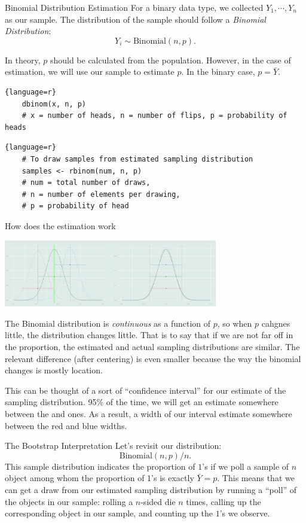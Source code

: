 \begin{thm}{Binomial Distribution Estimation}
	For a binary data type, we collected $Y_1,\cdots,Y_n$ as our sample. The distribution of the sample should follow a \textit{Binomial Distribution}: \[Y_i\sim\text{Binomial}(n,p).\]
\end{thm}
\begin{rmk}
	In theory, $p$ should be calculated from the population. However, in the case of estimation, we will use our sample to estimate $p$. In the binary case, $p=\bar{Y}$.
\end{rmk}
\begin{lstlisting}[title=Binomial Distribution]{language=r}
	dbinom(x, n, p) 
	# x = number of heads, n = number of flips, p = probability of heads
\end{lstlisting}
\begin{lstlisting}[title=Binomial Sample]{language=r}
	# To draw samples from estimated sampling distribution
	samples <- rbinom(num, n, p)
	# num = total number of draws, 
	# n = number of elements per drawing, 
	# p = probability of head
\end{lstlisting}
\begin{eg}{How does the estimation work}
	\begin{center}\includegraphics[width=0.7\textwidth]{figs/BinomialDistribution.png}\end{center}	
	The Binomial distribution is \textit{continuous} as a function of $p$, so when $p$ cahgnes little, the distribution changes little. That is to say that if we are not far off in the proportion, the estimated and actual sampling distributions are similar. The relevant difference (after centering) is even smaller because the way the binomial changes is mostly location. \par 
	This can be thought of a sort of ``confidence interval'' for our estimate of the sampling distribution. 95\% of the time, we will get an estimate somewhere between the {\color{red}{red}} and {\color{blue}{blue}} ones. As a result, a width of our interval estimate somewhere between the red and blue widths. 
\end{eg}
\begin{eg}{The Bootstrap Interpretation}
	Let's revisit our distribution: \[\text{Binomial}(n,p)/n.\]	This sample distribution indicates the proportion of $1$'s if we poll a sample of $n$ object among whom the proportion of $1$'s is exactly $\bar{Y}=p$. This means that we can get a draw from our estimated sampling distribution by running a ``poll'' of the objects in our sample: rolling a $n$-sided die $n$ times, calling up the corresponding object in our sample, and counting up the $1$'s we observe.  
\end{eg}


